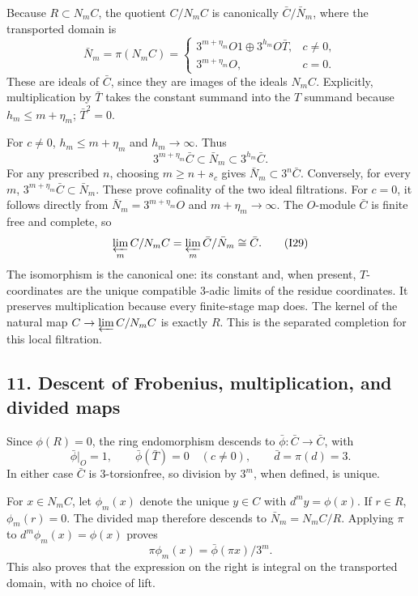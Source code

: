 \documentclass[
  10pt,
]{article}
\begin{document}
Because \(R\subset N_mC\), the quotient \(C/N_mC\) is canonically
\(\bar C/\bar N_m\), where the transported domain is \[
\bar N_m=\pi(N_mC)=
\begin{cases}
3^{m+\eta_m}O1\oplus3^{h_m}O\bar T,&c\ne0,\\
3^{m+\eta_m}O,&c=0.
\end{cases} \tag{I28}
\] These are ideals of \(\bar C\), since they are images of the ideals
\(N_mC\). Explicitly, multiplication by \(\bar T\) takes the constant
summand into the \(T\) summand because \(h_m\le m+\eta_m\);
\(\bar T^2=0\).

For \(c\ne0\), \(h_m\le m+\eta_m\) and \(h_m\to\infty\). Thus \[
3^{m+\eta_m}\bar C\subset\bar N_m\subset3^{h_m}\bar C.
\] For any prescribed \(n\), choosing \(m\ge n+s_c\) gives
\(\bar N_m\subset3^n\bar C\). Conversely, for every \(m\),
\(3^{m+\eta_m}\bar C\subset\bar N_m\). These prove cofinality of the two
ideal filtrations. For \(c=0\), it follows directly from
\(\bar N_m=3^{m+\eta_m}O\) and \(m+\eta_m\to\infty\). The \(O\)-module
\(\bar C\) is finite free and complete, so \[
\varprojlim_m C/N_mC
=\varprojlim_m\bar C/\bar N_m
\cong\bar C. \tag{I29}
\] The isomorphism is the canonical one: its constant and, when present,
\(T\)-coordinates are the unique compatible 3-adic limits of the residue
coordinates. It preserves multiplication because every finite-stage map
does. The kernel of the natural map \(C\to\varprojlim C/N_mC\) is
exactly \(R\). This is the separated completion for this local
filtration.

\subsection{11. Descent of Frobenius, multiplication, and divided
maps}\label{descent-of-frobenius-multiplication-and-divided-maps}

Since \(\phi(R)=0\), the ring endomorphism descends to
\(\bar\phi:\bar C\to\bar C\), with \[
\bar\phi|_O=1,\qquad \bar\phi(\bar T)=0
\quad(c\ne0),\qquad \bar d=\pi(d)=3.
\] In either case \(\bar C\) is 3-torsionfree, so division by \(3^m\),
when defined, is unique.

For \(x\in N_mC\), let \(\phi_m(x)\) denote the unique \(y\in C\) with
\(d^m y=\phi(x)\). If \(r\in R\), \(\phi_m(r)=0\). The divided map
therefore descends to \(\bar N_m=N_mC/R\). Applying \(\pi\) to
\(d^m\phi_m(x)=\phi(x)\) proves \[
\pi\phi_m(x)=\bar\phi(\pi x)/3^m. \tag{I30}
\] This also proves that the expression on the right is integral on the
transported domain, with no choice of lift.
\end{document}

